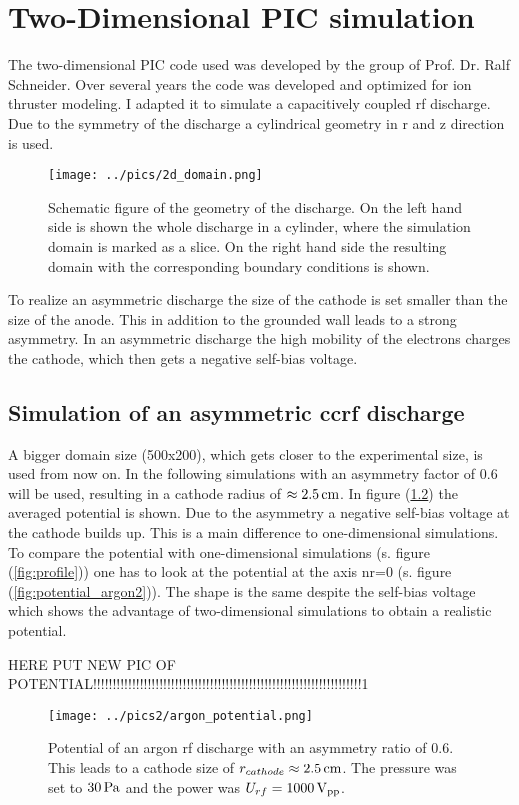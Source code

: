 \chapter{Two-Dimensional PIC simulation}
The two-dimensional PIC code used was developed by the group of Prof. Dr. Ralf Schneider.
Over several years the code was developed and optimized for ion thruster modeling.
I adapted it to simulate a capacitively coupled rf discharge.\\
Due to the symmetry of the discharge a cylindrical geometry in r and z direction is used.

\begin{figure}[htbp]
    \centering
    \texttt{[image: ../pics/2d\_domain.png]}
    \caption{Schematic figure of the geometry of the discharge. On the left hand side is shown the whole discharge in a cylinder, where the simulation domain is marked as a slice. On the right hand side the resulting domain with the corresponding boundary conditions is shown.}
    \label{fig:2d_domain}
\end{figure}

To realize an asymmetric discharge the size of the cathode is set smaller than the size of the anode.
This in addition to the grounded wall leads to a strong asymmetry.
In an asymmetric discharge the high mobility of the electrons charges the cathode, which then gets a negative self-bias voltage. 

\section{Simulation of an asymmetric ccrf discharge}
A bigger domain size (500x200), which gets closer to the experimental size, is used from now on.
In the following simulations with an asymmetry factor of 0.6 will be used, resulting in a cathode radius of $\approx2.5\,\mathrm{cm}$. 
In figure (\ref{fig:potential_argon1}) the averaged potential is shown.
Due to the asymmetry a negative self-bias voltage at the cathode builds up. 
This is a main difference to one-dimensional simulations.
To compare the potential with one-dimensional simulations (s. figure (\ref{fig:profile})) one has to look at the potential at the axis nr=0 (s. figure (\ref{fig:potential_argon2})).
The shape is the same despite the self-bias voltage which shows the advantage of two-dimensional simulations to obtain a realistic potential.

HERE PUT NEW PIC OF POTENTIAL!!!!!!!!!!!!!!!!!!!!!!!!!!!!!!!!!!!!!!!!!!!!!!!!!!!!!!!!!!!!!!!!!!!!!1
\begin{figure}[htbp]
    \centering
    \texttt{[image: ../pics2/argon\_potential.png]}
    \caption{Potential of an argon rf discharge with an asymmetry ratio of $0.6$. This leads to a cathode size of $r_{cathode}\approx2.5\,\mathrm{cm}$. The pressure was set to $30\,\mathrm{Pa}$ and the power was $U_{rf}=1000\,\mathrm{V_{pp}}$.}
    \label{fig:potential_argon1}
\end{figure}

